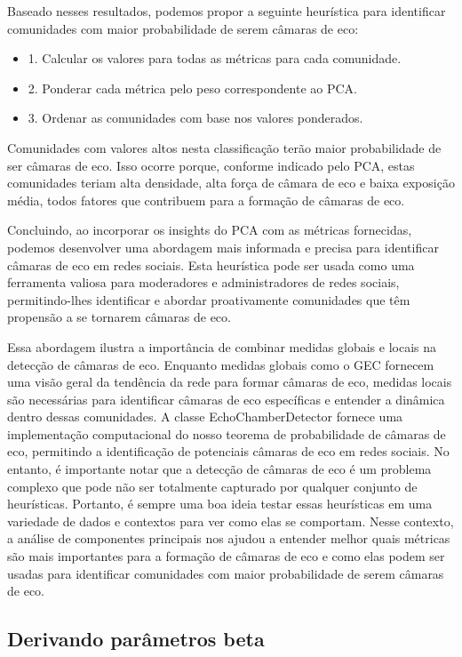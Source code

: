 
Baseado nesses resultados, podemos propor a seguinte heurística para identificar comunidades com maior probabilidade de serem câmaras de eco:

\begin{itemize}
	\item 1. Calcular os valores para todas as métricas para cada comunidade.
	\item 2. Ponderar cada métrica pelo peso correspondente ao PCA.
	\item 3. Ordenar as comunidades com base nos valores ponderados.
\end{itemize}

Comunidades com valores altos nesta classificação terão maior probabilidade de ser câmaras de eco. Isso ocorre porque, conforme indicado pelo PCA, estas comunidades teriam alta densidade, alta força de câmara de eco e baixa exposição média, todos fatores que contribuem para a formação de câmaras de eco.

Concluindo, ao incorporar os insights do PCA com as métricas fornecidas, podemos desenvolver uma abordagem mais informada e precisa para identificar câmaras de eco em redes sociais. Esta heurística pode ser usada como uma ferramenta valiosa para moderadores e administradores de redes sociais, permitindo-lhes identificar e abordar proativamente comunidades que têm propensão a se tornarem câmaras de eco.

Essa abordagem ilustra a importância de combinar medidas globais e locais na detecção de câmaras de eco. Enquanto medidas globais como o GEC fornecem uma visão geral da tendência da rede para formar câmaras de eco, medidas locais são necessárias para identificar câmaras de eco específicas e entender a dinâmica dentro dessas comunidades. A classe EchoChamberDetector fornece uma implementação computacional do nosso teorema de probabilidade de câmaras de eco, permitindo a identificação de potenciais câmaras de eco em redes sociais. No entanto, é importante notar que a detecção de câmaras de eco é um problema complexo que pode não ser totalmente capturado por qualquer conjunto de heurísticas. Portanto, é sempre uma boa ideia testar essas heurísticas em uma variedade de dados e contextos para ver como elas se comportam. Nesse contexto, a análise de componentes principais nos ajudou a entender melhor quais métricas são mais importantes para a formação de câmaras de eco e como elas podem ser usadas para identificar comunidades com maior probabilidade de serem câmaras de eco.

\subsection{Derivando parâmetros beta}

